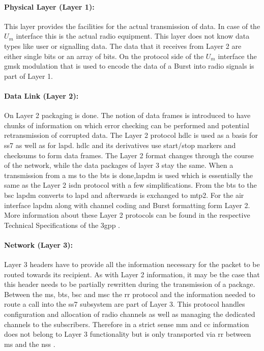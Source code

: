 \paragraph{Physical Layer (Layer 1):} This layer provides the facilities for the actual transmission of data.
In case of the $U_m$ interface this is the actual radio equipment.
This layer does not know data types like user or signalling data.
The data that it receives from Layer 2 are either single bits or an array of bits.
On the protocol side of the $U_m$ interface the \gls{gmsk} modulation that is used to encode the data of a Burst into radio signals is part of Layer 1.

\paragraph{Data Link (Layer 2):} On Layer 2 packaging is done.
The notion of data frames is introduced to have chunks of information on which error checking can be performed and potential retransmission of corrupted data.
The Layer 2 protocol \gls{hdlc} is used as a basis for \gls{ss7} as well as for \gls{lapd}.
\gls{hdlc} and its derivatives use start/stop markers and checksums to form data frames.
The Layer 2 format changes through the course of the network, while the data packages of layer 3 stay the same.
When a transmission from a \gls{ms} to the \gls{bts} is done,\gls{lapdm} is used which is essentially the same as the Layer 2 \gls{isdn} protocol with a few simplifications.
From the \gls{bts} to the \gls{bsc} \gls{lapdm} converts to \gls{lapd} and afterwards is exchanged to \gls{mtp2}.
For the air interface \gls{lapdm} along with channel coding and Burst formatting form Layer 2.
More information about these Layer 2 protocols can be found in the respective Technical Specifications of the \gls{3gpp} \cite{3gpp_ts_0405,3gpp_ts_0406}.

\paragraph{Network (Layer 3):} Layer 3 headers have to provide all the information necessary for the packet to be routed towards its recipient.
As with Layer 2 information, it may be the case that this header needs to be partially rewritten during the transmission of a package.
Between the \gls{ms}, \gls{bts}, \gls{bsc} and \gls{msc} the \gls{rr} protocol and the information needed to route a call into the \gls{ss7} subsystem are part of Layer 3.
This protocol handles configuration and allocation of radio channels as well as managing the dedicated channels to the subscribers.
Therefore in a strict sense \gls{mm} and \gls{cc} information does not belong to Layer 3 functionality but is only transported via \gls{rr} between \gls{ms} and the \gls{nss} \cite{protocols1999}.

